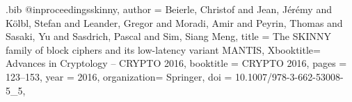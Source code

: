 \documentclass[table,aspectratio=169]{beamer}
\begin{document}
\begin{filecontents*}[overwrite]{\jobname.bib}
@inproceedings{skinny,  
  author    = {Beierle, Christof and 
              Jean, J{\'e}r{\'e}my and 
              K{\"o}lbl, Stefan and 
              Leander, Gregor and 
              Moradi, Amir and 
              Peyrin, Thomas and 
              Sasaki, Yu and 
              Sasdrich, Pascal and 
              Sim, Siang Meng},
  title     = {{The SKINNY family of block ciphers and its low-latency variant MANTIS}},
  Xbooktitle= {Advances in Cryptology -- CRYPTO 2016},
  booktitle = {{CRYPTO} 2016},
  pages     = {123--153},
  year      = {2016},
  organization= {Springer},
  doi       = {10.1007/978-3-662-53008-5_5},
}

\end{filecontents*}
\end{document}
